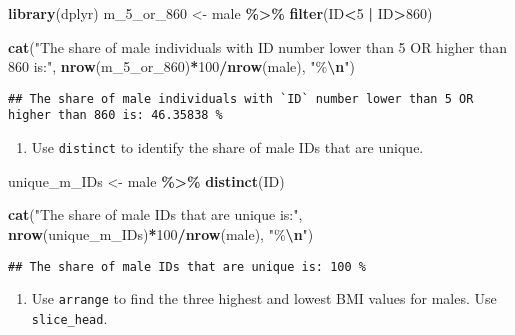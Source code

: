 \documentclass[
]{book}
\newenvironment{Shaded}{\begin{snugshade}}{\end{snugshade}}
\newcommand{\DecValTok}[1]{\textcolor[rgb]{0.00,0.00,0.81}{#1}}
\newcommand{\FunctionTok}[1]{\textcolor[rgb]{0.13,0.29,0.53}{\textbf{#1}}}
\newcommand{\NormalTok}[1]{#1}
\newcommand{\OtherTok}[1]{\textcolor[rgb]{0.56,0.35,0.01}{#1}}
\newcommand{\SpecialCharTok}[1]{\textcolor[rgb]{0.81,0.36,0.00}{\textbf{#1}}}
\newcommand{\StringTok}[1]{\textcolor[rgb]{0.31,0.60,0.02}{#1}}
\providecommand{\tightlist}{%
  \setlength{\itemsep}{0pt}\setlength{\parskip}{0pt}}
\begin{document}
\begin{Shaded}
\begin{Highlighting}[]
\FunctionTok{library}\NormalTok{(dplyr)}
\NormalTok{m\_5\_or\_860 }\OtherTok{\textless{}{-}}\NormalTok{ male }\SpecialCharTok{\%\textgreater{}\%}
  \FunctionTok{filter}\NormalTok{(ID}\SpecialCharTok{\textless{}}\DecValTok{5} \SpecialCharTok{|}\NormalTok{ ID}\SpecialCharTok{\textgreater{}}\DecValTok{860}\NormalTok{)}

\FunctionTok{cat}\NormalTok{(}\StringTok{"The share of male individuals with \textasciigrave{}ID\textasciigrave{} number lower than 5 OR higher than 860 is:"}\NormalTok{, }\FunctionTok{nrow}\NormalTok{(m\_5\_or\_860)}\SpecialCharTok{*}\DecValTok{100}\SpecialCharTok{/}\FunctionTok{nrow}\NormalTok{(male), }\StringTok{"\%}\SpecialCharTok{\textbackslash{}n}\StringTok{"}\NormalTok{)}
\end{Highlighting}
\end{Shaded}

\begin{verbatim}
## The share of male individuals with `ID` number lower than 5 OR higher than 860 is: 46.35838 %
\end{verbatim}

\begin{enumerate}
\def\labelenumi{\arabic{enumi}.}
\setcounter{enumi}{9}
\tightlist
\item
  Use \texttt{distinct} to identify the share of male IDs that are unique.
\end{enumerate}

\begin{Shaded}
\begin{Highlighting}[]
\NormalTok{unique\_m\_IDs }\OtherTok{\textless{}{-}}\NormalTok{ male }\SpecialCharTok{\%\textgreater{}\%}
  \FunctionTok{distinct}\NormalTok{(ID)}
  
\FunctionTok{cat}\NormalTok{(}\StringTok{"The share of male IDs that are unique is:"}\NormalTok{, }\FunctionTok{nrow}\NormalTok{(unique\_m\_IDs)}\SpecialCharTok{*}\DecValTok{100}\SpecialCharTok{/}\FunctionTok{nrow}\NormalTok{(male), }\StringTok{"\%}\SpecialCharTok{\textbackslash{}n}\StringTok{"}\NormalTok{)}
\end{Highlighting}
\end{Shaded}

\begin{verbatim}
## The share of male IDs that are unique is: 100 %
\end{verbatim}

\begin{enumerate}
\def\labelenumi{\arabic{enumi}.}
\setcounter{enumi}{10}
\tightlist
\item
  Use \texttt{arrange} to find the three highest and lowest BMI values for males. Use \texttt{slice\_head}.
\end{enumerate}
\end{document}
